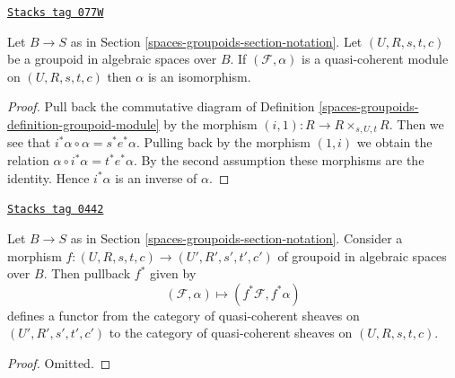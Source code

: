 \begin{lemma}[Isomorphism]
\label{spaces-groupoids-lemma-isomorphism}
\href{https://stacks.math.columbia.edu/tag/077W}{\texttt{Stacks tag 077W}}

Let $B \to S$ as in Section \ref{spaces-groupoids-section-notation}.
Let $(U, R, s, t, c)$ be a groupoid in algebraic spaces over $B$.
If $(\mathcal{F}, \alpha)$ is a quasi-coherent module on $(U, R, s, t, c)$
then $\alpha$ is an isomorphism.
\end{lemma}

\begin{proof}
Pull back the commutative diagram of
Definition \ref{spaces-groupoids-definition-groupoid-module}
by the morphism $(i, 1) : R \to R \times_{s, U, t} R$.
Then we see that $i^*\alpha \circ \alpha = s^*e^*\alpha$.
Pulling back by the morphism $(1, i)$ we obtain the relation
$\alpha \circ i^*\alpha = t^*e^*\alpha$. By the second assumption
these morphisms are the identity. Hence $i^*\alpha$ is an inverse of
$\alpha$.
\end{proof}

\begin{lemma}[Pullback]
\label{spaces-groupoids-lemma-pullback}
\href{https://stacks.math.columbia.edu/tag/0442}{\texttt{Stacks tag 0442}}

Let $B \to S$ as in Section \ref{spaces-groupoids-section-notation}.
Consider a morphism
$f : (U, R, s, t, c) \to (U', R', s', t', c')$
of groupoid in algebraic spaces over $B$. Then pullback $f^*$ given by
$$
(\mathcal{F}, \alpha) \mapsto (f^*\mathcal{F}, f^*\alpha)
$$
defines a functor from the category of quasi-coherent sheaves on
$(U', R', s', t', c')$ to the category of quasi-coherent sheaves on
$(U, R, s, t, c)$.
\end{lemma}

\begin{proof}
Omitted.
\end{proof}

